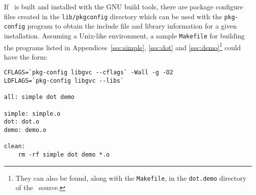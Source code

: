 If \gviz\ is built and installed with the GNU build tools,
there are package configure files created in the {\tt lib/pkgconfig} 
directory which can be used with the {\tt pkg-config} program
to obtain the include file and library information for 
a given installation.
Assuming a Unix-like environment, a sample {\tt Makefile} for building the
programs listed in Appendices~\ref{sec:simple}, \ref{sec:dot} 
and \ref{sec:demo}\footnote{They
can also be found, along with the {\tt Makefile}, in the
{\tt dot.demo} directory of the \gviz\ source.}
could have the form:

\begin{verbatim}
CFLAGS=`pkg-config libgvc --cflags` -Wall -g -O2
LDFLAGS=`pkg-config libgvc --libs`

all: simple dot demo

simple: simple.o
dot: dot.o
demo: demo.o

clean:
    rm -rf simple dot demo *.o
\end{verbatim}

